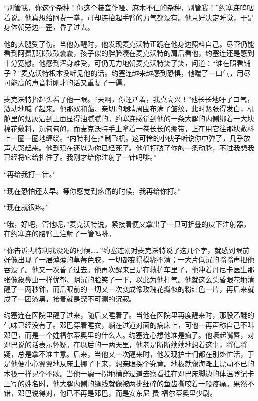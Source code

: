     “别管我，你这个杂种！你这个装聋作哑、麻木不仁的杂种，别管我！”约塞连呜咽着说。他真想给阿费一拳，可却连抬起手臂的力气都没有。他只好决定睡觉，于是身体朝旁边一歪，昏了过去。

    他的大腿受了伤。当他苏醒时，他发现麦克沃特正跪在他身边照料自己。尽管仍能看到阿费那张鼓鼓囊囊，孩子似的胖脸凑在麦克沃特的肩后看他，约塞连还是感到十分宽慰。他感到浑身难受，可仍无力地朝麦克沃特笑了笑，问道：“谁在照看铺子？”麦克沃特根本没听见他的话。约塞连越来越感到恐惧，他喘了一口气，用尽可能高的声音将刚才的话又重复了一遍。

    麦克沃特抬起头看了他一眼。“天啊，你还活着，我真高兴！”他长长地吁了口气，激动地喊了起来。他那双和蔼、亲切的眼睛周围布满了皱纹，此时紧张得发白，机舱里的烟灰沾到上面显得油腻腻的。约塞连感觉到他的一条大腿的内侧绑着一大块棉花敷料，沉甸甸的，而麦克沃特手上拿着一卷长长的绷带，正在用它往那块敷料上一圈一圈地缠绕。“内特利在控制飞机。这可怜的小伙子听说你中弹了，几乎放声大哭起来。他到现在还以为你已经死了。他们打破了你的一条动脉，不过我想我已经将它给扎住了。我刚才给你注射了一针吗啡。”

    “再给我打一针。”

    “现在恐怕还太早。等你感觉到疼痛的时候，我再给你打。”

    “现在就很疼。”

    “哦，好吧，管他呢，”麦克沃特说，紧接着便又拿出了一只可折叠的皮下注射器，在约塞连的胳臂上注射了一管吗啡。

    “你告诉内特利我没死的时候……”约塞连刚对麦克沃特说了这几个字，就感到眼前好像出现了一层薄薄的草莓色胶，一切都变得模糊不清；一大片低沉的嗡嗡声把他吞没了。他又一次昏了过去。他再次醒来已是在救护车里了，他冲着丹尼卡医生那张像象鼻虫一样忧郁、阴沉的脸笑了一下，以此为他打气。他就这么头昏眼花地清醒了一两秒钟，而后眼前的一切又一次变成像玫瑰花瓣似的粉红色一片，再后来就成了一团漆黑，接着就是深不可测的沉寂。

    约塞连在医院里醒了过来，随后又睡着了。当他在医院里再度醒来时，那股乙醚的气味已经没有了。邓巴穿着睡衣，躺在过道对面的病床上，可他一再声称自己不叫邓巴，而是一个姓福尔蒂奥里的什么人。约塞连心想他准是疯了。他噘起嘴唇，对邓巴说的话表示怀疑。在以后的一两天里，他老是断断续续地想着这事，将信将疑，总是拿不准主意。后来，当他又一次醒来时，他发现护士们都在别处忙活，于是他便小心翼翼地从床上挪了下来，想亲眼探个究竟。地板就像海滩上漂动不已的木筏一样晃个不歇。当他一瘸一拐地横穿过道去察看挂在邓巴床脚边的体温登记卡上写的姓名时，他大腿内侧的缝线就像被两排细碎的鱼齿撕咬着一般疼痛。果然不错，邓巴说得对，他已不再是邓巴，而是安东尼-费-福尔蒂奥里少尉。


